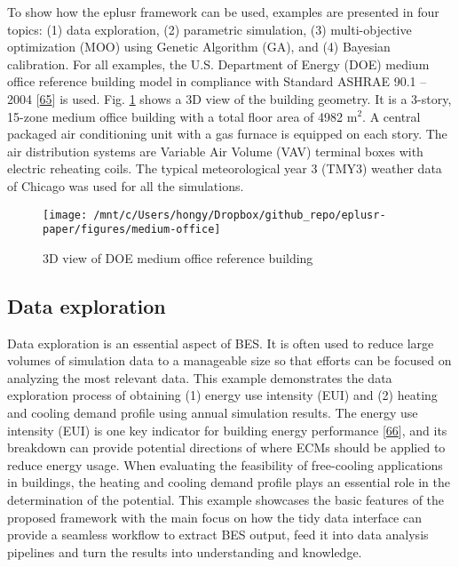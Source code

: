 \documentclass[3p, times]{elsarticle} %
\begin{document}
To show how the eplusr framework can be used, examples are presented in four
topics: (1) data exploration, (2) parametric simulation, (3) multi-objective
optimization (MOO) using Genetic Algorithm (GA), and (4) Bayesian calibration.
For all examples, the U.S. Department of Energy (DOE) medium office reference
building model in compliance with Standard ASHRAE 90.1 -- 2004 {[}\protect\hyperlink{ref-Field2010}{65}{]} is
used. Fig. \ref{fig:medium-office} shows a 3D view of the building geometry. It
is a 3-story, 15-zone medium office building with a total floor area of 4982
\(\mathrm{m}^2\). A central packaged air conditioning unit with a gas furnace is
equipped on each story. The air distribution systems are Variable Air Volume
(VAV) terminal boxes with electric reheating coils. The typical meteorological
year 3 (TMY3) weather data of Chicago was used for all the simulations.

\begin{figure}[!htb]
\texttt{[image: /mnt/c/Users/hongy/Dropbox/github\_repo/eplusr-paper/figures/medium-office]} \caption{3D view of DOE medium office reference building}\label{fig:medium-office}
\end{figure}

\hypertarget{sec:basic}{%
\subsection{Data exploration}\label{sec:basic}}

Data exploration is an essential aspect of BES. It is often used to reduce large
volumes of simulation data to a manageable size so that efforts can be focused
on analyzing the most relevant data. This example demonstrates the data
exploration process of obtaining (1) energy use intensity (EUI) and (2) heating
and cooling demand profile using annual simulation results. The energy use
intensity (EUI) is one key indicator for building energy performance
{[}\protect\hyperlink{ref-Yoon2017Objective}{66}{]}, and its breakdown can provide potential directions of
where ECMs should be applied to reduce energy usage. When evaluating the
feasibility of free-cooling applications in buildings, the heating and cooling
demand profile plays an essential role in the determination of the potential.
This example showcases the basic features of the proposed framework with the
main focus on how the tidy data interface can provide a seamless workflow to
extract BES output, feed it into data analysis pipelines and turn the results
into understanding and knowledge.
\end{document}
